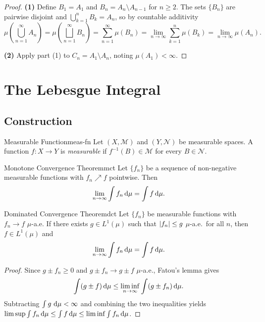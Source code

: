 \begin{proof}
    \textbf{(1)} Define $B_1 = A_1$ and $B_n = A_n \setminus A_{n-1}$ for
    $n \geq 2$. The sets $\{B_n\}$ are pairwise disjoint and
    $\bigcup_{k=1}^{n} B_k = A_n$, so by countable additivity
    \[
        \mu\!\left(\bigcup_{n=1}^{\infty} A_n\right)
        = \mu\!\left(\bigsqcup_{n=1}^{\infty} B_n\right)
        = \sum_{n=1}^{\infty} \mu(B_n)
        = \lim_{n\to\infty}\sum_{k=1}^{n}\mu(B_k)
        = \lim_{n\to\infty}\mu(A_n).
    \]

    \textbf{(2)} Apply part (1) to $C_n = A_1 \setminus A_n$, noting
    $\mu(A_1) < \infty$.
\end{proof}

\section{The Lebesgue Integral}

\subsection{Construction}

\begin{definition}{Measurable Function}{meas-fn}
    Let $(X,\mathcal{M})$ and $(Y,\mathcal{N})$ be measurable spaces.
    A function $f: X \to Y$ is \emph{measurable} if
    $f^{-1}(B) \in \mathcal{M}$ for every $B \in \mathcal{N}$.
\end{definition}

\begin{lemma}{Monotone Convergence Theorem}{mct}
    Let $\{f_n\}$ be a sequence of non-negative measurable functions with
    $f_n \nearrow f$ pointwise. Then
    \[
        \lim_{n\to\infty} \int f_n \,\mathrm{d}\mu = \int f \,\mathrm{d}\mu.
    \]
\end{lemma}

\begin{theorem}{Dominated Convergence Theorem}{dct}
    Let $\{f_n\}$ be measurable functions with $f_n \to f$ $\mu$-a.e.
    If there exists $g \in L^1(\mu)$ such that $\lvert f_n\rvert \leq g$ $\mu$-a.e.\
    for all $n$, then $f \in L^1(\mu)$ and
    \[
        \lim_{n\to\infty} \int f_n \,\mathrm{d}\mu = \int f \,\mathrm{d}\mu.
    \]
\end{theorem}

\begin{proof}
    Since $g \pm f_n \geq 0$ and $g \pm f_n \to g \pm f$ $\mu$-a.e.,
    Fatou's lemma gives
    \[
        \int (g \pm f)\,\mathrm{d}\mu \leq \liminf_{n\to\infty}\int(g\pm f_n)\,\mathrm{d}\mu.
    \]
    Subtracting $\int g\,\,\mathrm{d}\mu < \infty$ and combining the two inequalities yields
    $\limsup \int f_n\,\mathrm{d}\mu \leq \int f\,\mathrm{d}\mu \leq \liminf \int f_n\,\mathrm{d}\mu$.
\end{proof}


